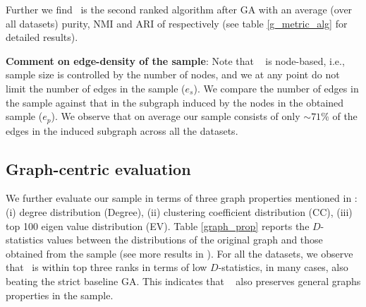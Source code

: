 Further we find \compas~is the second ranked algorithm after GA with an average 
(over all datasets) purity, NMI and ARI of  respectively (see table \ref{g_metric_alg} for detailed results). 

{\bf Comment on edge-density of the sample}: 
Note that \compas~ is node-based, i.e., sample size is controlled by the number of nodes, and we at any point do not limit the number of edges in the sample ($e_{s}$). We compare the number of edges in the sample against that in the subgraph induced by the nodes in the obtained sample ($e_{p}$). 
We observe that on average our sample consists of only $\sim71$\% of the edges in the induced subgraph across all the datasets. 
\iffalse
\subsection{Graph-centric evaluation}
\label{graph_evaluation}
We further evaluate our sample in terms of three graph properties mentioned in \cite{ahmed2014network}: (i) degree distribution (Degree), (ii) clustering coefficient distribution (CC), (iii) top 100 eigen value distribution (EV). 
Table \ref{graph_prop} reports the $D$-statistics values between the distributions of the original graph and those obtained from the sample (see more results in \cite{si}). For all the datasets, we observe that \compas~is within top three ranks in terms of low $D$-statistics, in many cases, also beating the strict baseline GA. This indicates that \compas~ also preserves general graphs properties in the sample.

